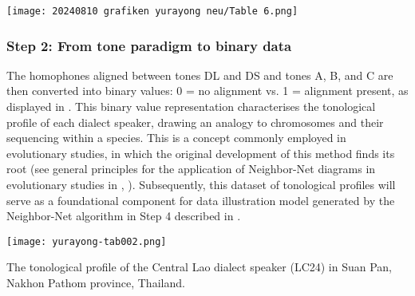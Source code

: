 \documentclass[output=paper]{langscibook}
\begin{document}
\begin{table}
\texttt{[image: 20240810 grafiken yurayong neu/Table 6.png]}
\caption{The tone paradigm of the Central Lao dialect speaker (LC24) in Suan Pan, Nakhon Pathom province, Thailand.}
\label{tab:yurayong:6}
\end{table}



\subsubsection{Step 2: From tone paradigm to binary data}
\label{sec:yurayong:3.2.2}
The homophones aligned between tones DL and DS and tones A, B, and C are then converted into binary values: 0 = no alignment vs. 1 = alignment present, as displayed in . This binary value representation characterises the tonological profile of each dialect speaker, drawing an analogy to chromosomes and their sequencing within a species. This is a concept commonly employed in evolutionary studies, in which the original development of this method finds its root (see general principles for the application of Neighbor-Net diagrams in evolutionary studies in \citealt{MaddisonEtAl1997}, \citealt{HusonBryant2006}). Subsequently, this dataset of tonological profiles will serve as a foundational component for data illustration model generated by the Neighbor-Net algorithm in Step 4 described in .

\begin{table}
\texttt{[image: yurayong-tab002.png]}
\caption{The tonological profile of the Central Lao dialect speaker (LC24) in Suan Pan, Nakhon Pathom province, Thailand.}
\label{tab:yurayong:7}
\end{table}
\end{document}
